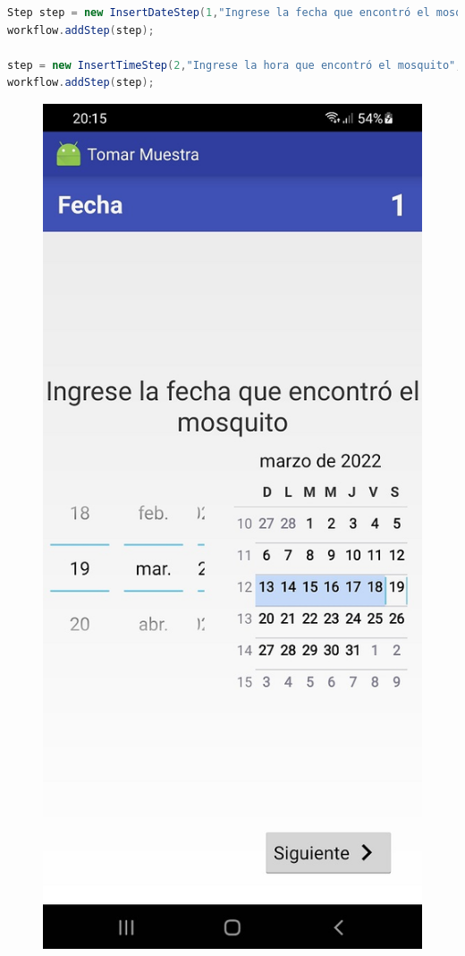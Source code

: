 \begin{lstlisting}[language=Java, frame=tlbr, caption=InsertDateStep e InsertTimeStep en Java.]	
Step step = new InsertDateStep(1,"Ingrese la fecha que encontró el mosquito",2);
workflow.addStep(step);

step = new InsertTimeStep(2,"Ingrese la hora que encontró el mosquito",3);
workflow.addStep(step);

\end{lstlisting}


\begin{figure}[H]
  \centering
    \includegraphics[scale=0.3]{50-anexos/C-steps/insert_date_screen.jpg} 

\end{figure}
